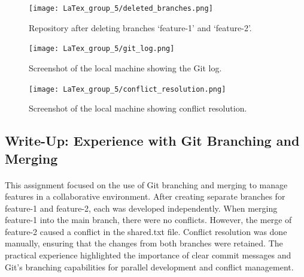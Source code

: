 \documentclass[a4paper,12pt]{article}
\begin{document}
\begin{figure}[h!]
    \centering
    \texttt{[image: LaTex\_group\_5/deleted\_branches.png]}
       \hspace{4 cm}
    \caption{Repository after deleting branches `feature-1' and `feature-2'.}
    \label{fig:enter-label}
\end{figure}
\hspace{6 cm}
\begin{figure}[h!]
    \centering
    \texttt{[image: LaTex\_group\_5/git\_log.png]} %
    \hspace{4 cm}
    \caption{Screenshot of the local machine showing the Git log.}
\end{figure}
\hspace{6 cm}
\begin{figure}[h!]
    \centering
    \texttt{[image: LaTex\_group\_5/conflict\_resolution.png]} %
       \hspace{4 cm}
    \caption{Screenshot of the local machine showing conflict resolution.}
\end{figure}
\newpage
{}
\vspace{0.5 cm}
\subsection*{\Huge{Write-Up: Experience with Git Branching and Merging}}
\hspace{1 cm}
\paragraph {\noindent}{This assignment focused on the use of Git branching and merging to manage features in a collaborative environment. After creating separate branches for feature-1 and feature-2, each was developed independently.
When merging feature-1 into the main branch, there were no conflicts. However, the merge of feature-2 caused a conflict in the shared.txt file. Conflict resolution was done manually, ensuring that the changes from both branches were retained.
The practical experience highlighted the importance of clear commit messages and Git’s branching capabilities for parallel development and conflict management.}
\end{document}
